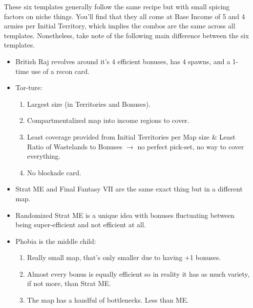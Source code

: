 These six templates generally follow the same recipe but with small spicing factors on niche things. You'll find that they all come at Base Income of 5 and 4 armies per Initial Territory, which implies the combos are the same across all templates. Nonetheless, take note of the following main difference between the six templates.
\begin{itemize}
    \item British Raj revolves around it's 4 efficient bonuses, has 4 spawns, and a 1-time use of a recon card.
    \item Tor-ture:
    \begin{enumerate}
        \item Largest size (in Territories and Bonuses).
        \item Compartmentalized map into income regions to cover.
        \item Least coverage provided from Initial Territories per Map size \& Least Ratio of Wastelands to Bonuses $\rightarrow$ no perfect pick-set, no way to cover everything.
        \item No blockade card.
    \end{enumerate}
    \item Strat ME and Final Fantasy VII are the same exact thing but in a different map.
    \item Randomized Strat ME is a unique idea with bonuses fluctuating between being super-efficient and not efficient at all.
    \item Phobia is the middle child:
    \begin{enumerate}
        \item Really small map, that's only smaller due to having +1 bonuses. 
        \item Almost every bonus is equally efficient so in reality it has as much variety, if not more, than Strat ME.
        \item The map has a handful of bottlenecks. Less than ME.
    \end{enumerate}
\end{itemize}
